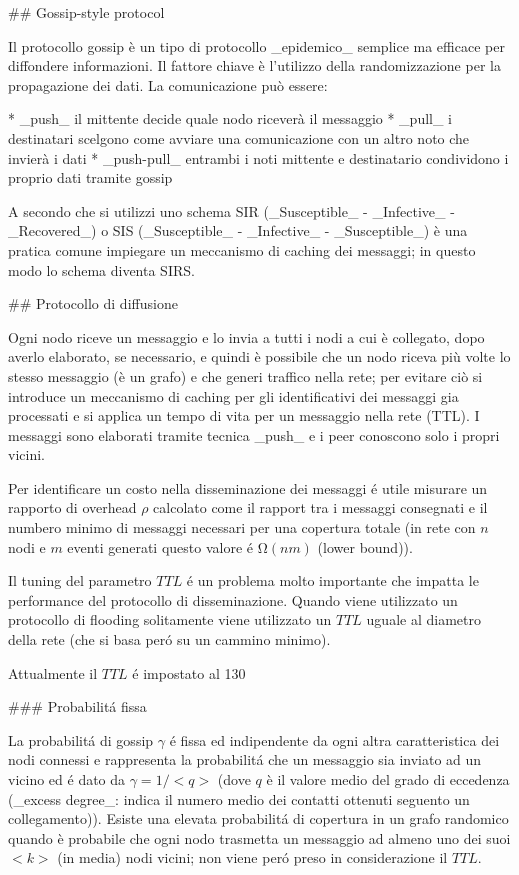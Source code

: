## Gossip-style protocol

Il protocollo gossip è un tipo di protocollo \_epidemico\_ semplice ma efficace per diffondere informazioni. Il fattore chiave è l'utilizzo della randomizzazione per la propagazione dei dati.
La comunicazione può essere:

* \_push\_ il mittente decide quale nodo riceverà il messaggio
* \_pull\_ i destinatari scelgono come avviare una comunicazione con un altro noto che invierà i dati
* \_push-pull\_ entrambi i noti mittente e destinatario condividono i proprio dati tramite gossip

A secondo che si utilizzi uno schema SIR (\_Susceptible\_ - \_Infective\_ - \_Recovered\_) o SIS (\_Susceptible\_ - \_Infective\_ - \_Susceptible\_) è una pratica comune impiegare un meccanismo di caching dei messaggi; in questo modo lo schema diventa SIRS.

## Protocollo di diffusione

Ogni nodo riceve un messaggio e lo invia a tutti i nodi a cui è collegato, dopo averlo elaborato, se necessario, e quindi è possibile che un nodo riceva più volte lo stesso messaggio (è un grafo) e che generi traffico nella rete; per evitare ciò si introduce un meccanismo di caching per gli identificativi dei messaggi gia processati e si applica un tempo di vita per un messaggio nella rete (TTL). I messaggi sono elaborati tramite tecnica \_push\_ e i peer conoscono solo i propri vicini.

Per identificare un costo nella disseminazione dei messaggi é utile misurare un rapporto di overhead $ρ$ calcolato come il rapport tra i messaggi consegnati e il numbero minimo di messaggi necessari per una copertura totale (in rete con $n$ nodi e $m$ eventi generati questo valore é $Ω(nm)$ (lower bound)).

Il tuning del parametro $TTL$ é un problema molto importante che impatta le performance del protocollo di disseminazione. Quando viene utilizzato un protocollo di flooding solitamente viene utilizzato un $TTL$ uguale al diametro della rete (che si basa peró su un cammino minimo).

Attualmente il $TTL$ é impostato al 130%

### Probabilitá fissa

La probabilitá di gossip $𝛾$ é fissa ed indipendente da ogni altra caratteristica dei nodi connessi e rappresenta la probabilitá che un messaggio sia inviato ad un vicino ed é dato da $𝛾 = 1/<q>$ (dove $q$ è il valore medio del grado di eccedenza (\_excess degree\_: indica il numero medio dei contatti ottenuti seguento un collegamento)). Esiste una elevata probabilitá di copertura in un grafo randomico quando è probabile che ogni nodo trasmetta un messaggio ad almeno uno dei suoi $<k>$ (in media) nodi vicini; non viene peró preso in considerazione il $TTL$.

